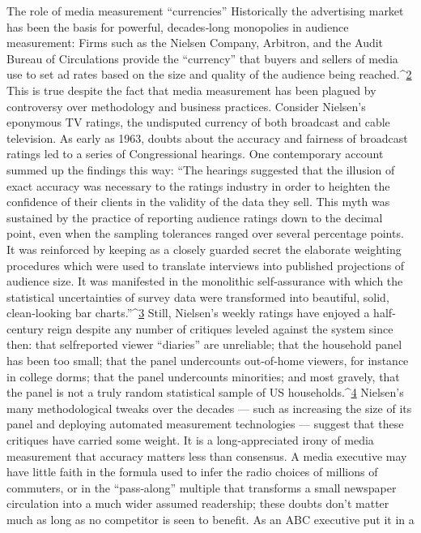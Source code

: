 The role of media measurement ``currencies''
Historically the advertising market has been the basis for powerful,
decades‐long monopolies in audience measurement: Firms such as the
Nielsen Company, Arbitron, and the Audit Bureau of Circulations
provide the ``currency'' that buyers and sellers of media use to set ad rates
based on the size and quality of the audience being reached.^{\href{#endnotes}{2}} This is true
despite the fact that media measurement has been plagued by controversy
over methodology and business practices.
Consider Nielsen’s eponymous TV ratings, the undisputed currency of
both broadcast and cable television. As early as 1963, doubts about the
accuracy and fairness of broadcast ratings led to a series of Congressional
hearings. One contemporary account summed up the findings this way:
``The hearings suggested that the illusion of exact accuracy was
necessary to the ratings industry in order to heighten the
confidence of their clients in the validity of the data they sell. This
myth was sustained by the practice of reporting audience ratings
down to the decimal point, even when the sampling tolerances
ranged over several percentage points. It was reinforced by keeping
as a closely guarded secret the elaborate weighting procedures
which were used to translate interviews into published projections
of audience size. It was manifested in the monolithic self‐assurance
with which the statistical uncertainties of survey data were
transformed into beautiful, solid, clean‐looking bar charts.''^{\href{#endnotes}{3}}
Still, Nielsen’s weekly ratings have enjoyed a half‐century reign despite
any number of critiques leveled against the system since then: that selfreported
viewer ``diaries'' are unreliable; that the household panel has
been too small; that the panel undercounts out‐of‐home viewers, for
instance in college dorms; that the panel undercounts minorities; and most
gravely, that the panel is not a truly random statistical sample of US
households.^{\href{#endnotes}{4}} Nielsen’s many methodological tweaks over the decades —
such as increasing the size of its panel and deploying automated
measurement technologies — suggest that these critiques have carried
some weight.
It is a long‐appreciated irony of media measurement that accuracy matters
less than consensus. A media executive may have little faith in the
formula used to infer the radio choices of millions of commuters, or in the
``pass‐along'' multiple that transforms a small newspaper circulation into
a much wider assumed readership; these doubts don’t matter much as
long as no competitor is seen to benefit. As an ABC executive put it in a
